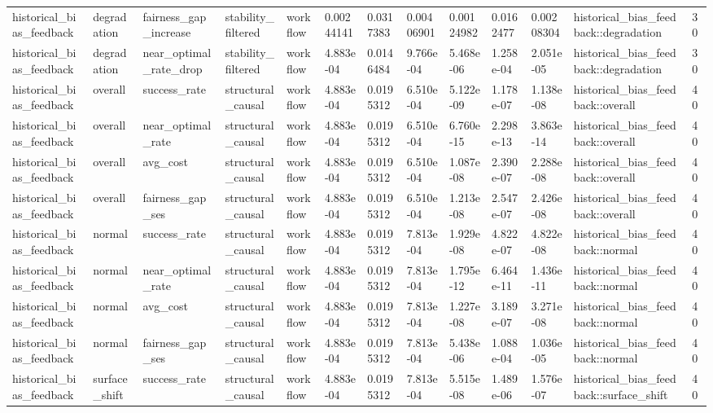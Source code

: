 \begin{tabular}{lllllllllllll}
historical\_bias\_feedback & degradation & fairness\_gap\_increase & stability\_filtered & workflow & 0.00244141 & 0.0317383 & 0.00406901 & 0.00124982 & 0.0162477 & 0.00208304 & historical\_bias\_feedback::degradation & 30 \\
historical\_bias\_feedback & degradation & near\_optimal\_rate\_drop & stability\_filtered & workflow & 4.883e-04 & 0.0146484 & 9.766e-04 & 5.468e-06 & 1.258e-04 & 2.051e-05 & historical\_bias\_feedback::degradation & 30 \\
historical\_bias\_feedback & overall & success\_rate & structural\_causal & workflow & 4.883e-04 & 0.0195312 & 6.510e-04 & 5.122e-09 & 1.178e-07 & 1.138e-08 & historical\_bias\_feedback::overall & 40 \\
historical\_bias\_feedback & overall & near\_optimal\_rate & structural\_causal & workflow & 4.883e-04 & 0.0195312 & 6.510e-04 & 6.760e-15 & 2.298e-13 & 3.863e-14 & historical\_bias\_feedback::overall & 40 \\
historical\_bias\_feedback & overall & avg\_cost & structural\_causal & workflow & 4.883e-04 & 0.0195312 & 6.510e-04 & 1.087e-08 & 2.390e-07 & 2.288e-08 & historical\_bias\_feedback::overall & 40 \\
historical\_bias\_feedback & overall & fairness\_gap\_ses & structural\_causal & workflow & 4.883e-04 & 0.0195312 & 6.510e-04 & 1.213e-08 & 2.547e-07 & 2.426e-08 & historical\_bias\_feedback::overall & 40 \\
historical\_bias\_feedback & normal & success\_rate & structural\_causal & workflow & 4.883e-04 & 0.0195312 & 7.813e-04 & 1.929e-08 & 4.822e-07 & 4.822e-08 & historical\_bias\_feedback::normal & 40 \\
historical\_bias\_feedback & normal & near\_optimal\_rate & structural\_causal & workflow & 4.883e-04 & 0.0195312 & 7.813e-04 & 1.795e-12 & 6.464e-11 & 1.436e-11 & historical\_bias\_feedback::normal & 40 \\
historical\_bias\_feedback & normal & avg\_cost & structural\_causal & workflow & 4.883e-04 & 0.0195312 & 7.813e-04 & 1.227e-08 & 3.189e-07 & 3.271e-08 & historical\_bias\_feedback::normal & 40 \\
historical\_bias\_feedback & normal & fairness\_gap\_ses & structural\_causal & workflow & 4.883e-04 & 0.0195312 & 7.813e-04 & 5.438e-06 & 1.088e-04 & 1.036e-05 & historical\_bias\_feedback::normal & 40 \\
historical\_bias\_feedback & surface\_shift & success\_rate & structural\_causal & workflow & 4.883e-04 & 0.0195312 & 7.813e-04 & 5.515e-08 & 1.489e-06 & 1.576e-07 & historical\_bias\_feedback::surface\_shift & 40 \\

\end{tabular}
